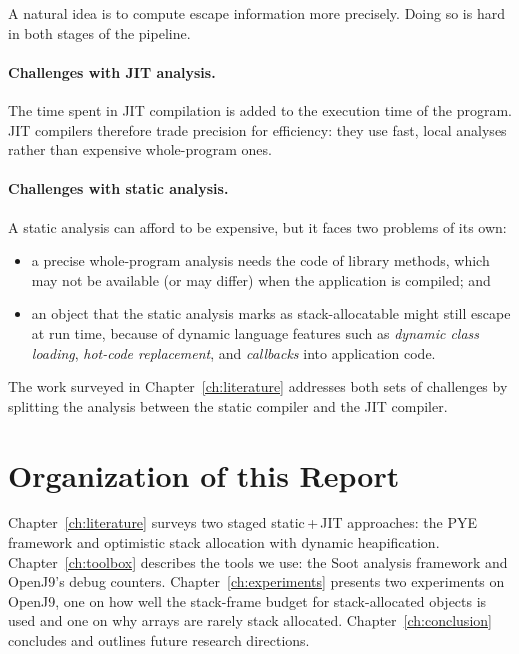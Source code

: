 A natural idea is to compute escape information more precisely. Doing so is hard in both stages
of the pipeline.

\paragraph{Challenges with JIT analysis.} The time spent in JIT compilation is added to the
execution time of the program. JIT compilers therefore trade precision for efficiency: they use
fast, local analyses rather than expensive whole-program ones.

\paragraph{Challenges with static analysis.} A static analysis can afford to be expensive, but it
faces two problems of its own:
\begin{itemize}
  \item a precise whole-program analysis needs the code of library methods, which may not be
        available (or may differ) when the application is compiled; and
  \item an object that the static analysis marks as stack-allocatable might still escape at run
        time, because of dynamic language features such as \emph{dynamic class loading},
        \emph{hot-code replacement}, and \emph{callbacks} into application code.
\end{itemize}

The work surveyed in Chapter~\ref{ch:literature} addresses both sets of challenges by splitting
the analysis between the static compiler and the JIT compiler.

\section{Organization of this Report}

Chapter~\ref{ch:literature} surveys two staged static\,+\,JIT approaches: the PYE framework and
optimistic stack allocation with dynamic heapification. Chapter~\ref{ch:toolbox} describes the
tools we use: the Soot analysis framework and OpenJ9's debug counters.
Chapter~\ref{ch:experiments} presents two experiments on OpenJ9, one on how well the stack-frame
budget for stack-allocated objects is used and one on why arrays are rarely stack allocated.
Chapter~\ref{ch:conclusion} concludes and outlines future research directions.
